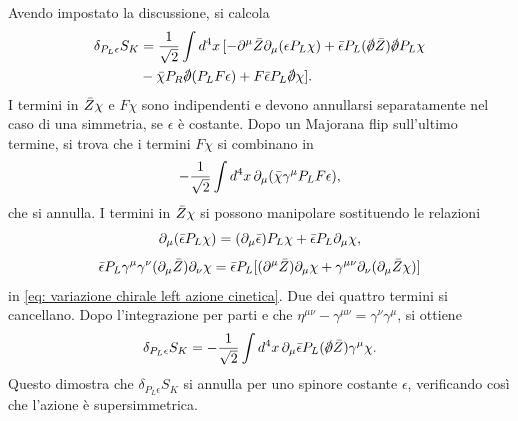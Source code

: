 Avendo impostato la discussione, si calcola 
\begin{equation}
\label{eq: variazione chirale left azione cinetica}
    \begin{split}
        \delta_{P_L\epsilon}S_K &= \frac{1}{\sqrt{2}}\int d^4x\,[-\p^\mu \b{Z}\p_\mu(\epsilon P_L\chi) + \b{\epsilon}P_L(\sl{\p}\b{Z})\sl{\p}P_L\chi \\
        &- \b{\chi}P_R\sl{\p}(P_LF\epsilon) + F\b{\epsilon}P_L\sl{\p}\chi].
    \end{split}
\end{equation}
I termini in $\bar{Z}\chi$ e $F\chi$ sono indipendenti e devono annullarsi separatamente nel caso di una simmetria, se $\epsilon$ è costante. Dopo un Majorana flip sull'ultimo termine, si trova che i termini $F\chi$ si combinano in 
\begin{equation}
    -\frac{1}{\sqrt{2}}\int d^4x\,\partial_\mu(\bar{\chi}\gamma^\mu P_LF\epsilon),
\end{equation}
che si annulla. I termini in $\bar{Z}\chi$ si possono manipolare sostituendo le relazioni
\begin{equation}
    \partial_\mu(\bar{\epsilon}P_L\chi) = (\partial_\mu\bar{\epsilon})P_L\chi + \bar{\epsilon}P_L\partial_\mu\chi,    
\end{equation}
\begin{equation}
    \bar{\epsilon}P_L\gamma^\mu\gamma^\nu(\partial_\mu\bar{Z})\partial_\nu\chi = \bar{\epsilon}P_L[(\partial^\mu\bar{Z})\partial_\mu\chi + \gamma^{\mu\nu}\partial_\nu(\partial_\mu\bar{Z}\chi)]
\end{equation}
in \eqref{eq: variazione chirale left azione cinetica}. Due dei quattro termini si cancellano. Dopo l'integrazione per parti e che $\eta^{\mu\nu} - \gamma^{\mu\nu} = \gamma^\nu\gamma^\mu$, si ottiene 
\begin{equation}
\label{eq: variazione azione cinetica (finale)}
    \delta_{P_L\epsilon}S_K = -\frac{1}{\sqrt{2}}\int d^4x\,\p_\mu\b{\epsilon}P_L(\sl{\p}\b{Z})\gamma^\mu\chi.
\end{equation}
Questo dimostra che $\delta_{P_L\epsilon}S_K$ si annulla per uno spinore costante $\epsilon$, verificando così che l'azione è supersimmetrica. 

